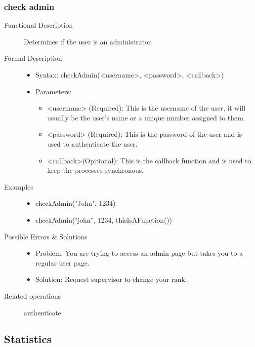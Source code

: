 \documentclass[a4paper]{article}
\begin{document}
\subsubsection{check admin}
\begin{description}
\item[Functional Description] Determines if the user is an administrator.
\item[Formal Description]\hfill
\begin{itemize}
	\item Syntax: checkAdmin(<username>, <password>, <callback>)\\
	\item Parameters:
		\begin{itemize}
			\item <username> (Required): This is the username of the user, it will usually be the user's name or a unique number assigned to them.
			\item <password> (Required): This is the password of the user and is used to authenticate the user.
			\item <callback>(Opitional): This is the callback function and is used to keep the processes synchronous.
		\end{itemize}
\end{itemize}
\item[Examples]\hfill
\begin{itemize}
	\item checkAdmin("John", 1234)
	\item checkAdmin("john", 1234, thisIsAFunction(){})
\end{itemize}
\item[Possible Errors \& Solutions]
\begin{itemize}
	\item Problem: You are trying to access an admin page but takes you to a regular user page.
	\item Solution: Request supervisor to change your rank.
\end{itemize}
\item[Related operations] authenticate
\end{description}

\subsection{Statistics}
\end{document}
